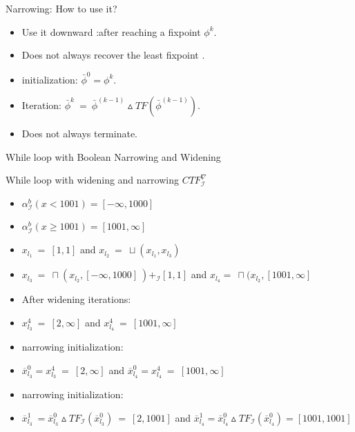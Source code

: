 \begin{frame}{Narrowing: How to use it?}
\begin{itemize}
	\item Use it downward :after reaching a  fixpoint $\phi^k$.
	\item Does not always recover the least fixpoint .
	\item initialization: $\bar{\phi}^0 = \phi^k$.
	\item Iteration: $\bar{\phi}^k~=~\bar{\phi}^{(k-1)} \vartriangle TF(\bar{\phi}^{(k-1)}).$ 
	\item Does not always terminate.
	
\end{itemize}	 
\end{frame}



\begin{frame}{While loop with Boolean Narrowing and Widening}
\begin{exampleblock}{While loop with widening and narrowing $CTF_\mathcal{I}^\nabla$}
	\centering 
	\begin{itemize}
		\item $\alpha_{\scriptscriptstyle \mathcal{I}}^{\scriptscriptstyle b} ( x < 1001) = [-\infty,1000]$
		\item $\alpha_{\scriptscriptstyle \mathcal{I}}^{\scriptscriptstyle b} ( x \geq 1001) = [1001,\infty]$
		\item $x_{l_1}~=~ [1,1]$ and  $x_{l_2}~=~ \sqcup(x_{l_1},x_{l_3})$
		\item $x_{l_3}~=~ \sqcap(x_{l_2},[-\infty,1000]~) +_\mathcal{I} [1,1]$ and  $x_{l_4} =~\sqcap(x_{l_2},[1001,\infty] $
		
		\item After widening iterations:\\
		\item $x_{l_3}^4~ =~[2,\infty] $ and $x_{l_4}^4~=~[1001,\infty]  $\\
		\item  narrowing initialization:\\
		\item $\overline{x}_{l_3}^0 = x_{l_3}^4~ =~[2,\infty] $ and $\overline{x}_{l_4}^0=x_{l_4}^4~=~[1001,\infty]  $\\
		\item  narrowing initialization:\\
		\item $\overline{x}_{l_3}^1~= \overline{x}_{l_3}^0  \vartriangle TF_\mathcal{I}(\overline{x}_{l_3}^0)~=~ [2,1001]$ and $\overline{x}_{l_4}^1= \overline{x}_{l_4}^0 \vartriangle TF_\mathcal{I}(\overline{x}_{l_4}^0) =[1001,1001] $\\	
	\end{itemize}
\end{exampleblock}
\end{frame}

